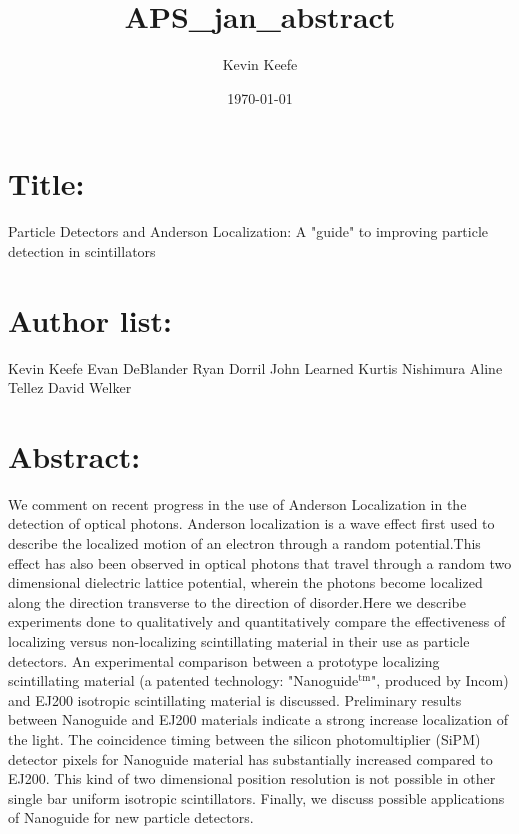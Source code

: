 \documentclass[11pt]{article}
\author{Kevin Keefe}
\date{\today}
\title{APS\_jan\_abstract}
\begin{document}
\maketitle
\tableofcontents

\section{Title:}
\label{sec-1}
Particle Detectors and Anderson Localization: A "guide" to improving particle detection in scintillators

\section{Author list:}
\label{sec-2}
Kevin Keefe
Evan DeBlander
Ryan Dorril
John Learned
Kurtis Nishimura
Aline Tellez
David Welker

\section{Abstract:}
\label{sec-3}
We comment on recent progress in the use of Anderson Localization in the detection of optical photons. Anderson localization is a wave effect first used to describe the localized motion of an electron through a random potential.This effect has also been observed in optical photons that travel through a random two dimensional dielectric lattice potential, wherein the photons become localized along the direction transverse to the direction of disorder.Here we describe experiments done to qualitatively and quantitatively compare the effectiveness of localizing versus non-localizing scintillating material in their use as particle detectors. An experimental comparison between a prototype localizing scintillating material (a patented technology: "Nanoguide$^{\text{tm}}$", produced by Incom) and EJ200 isotropic scintillating material is discussed. Preliminary results between Nanoguide and EJ200 materials indicate a strong increase localization of the light. The coincidence timing between the silicon photomultiplier (SiPM) detector pixels for Nanoguide material has substantially increased compared to EJ200. This kind of two dimensional position resolution is not possible in other single bar uniform isotropic scintillators. Finally, we discuss possible applications of Nanoguide for new particle detectors.
\end{document}
